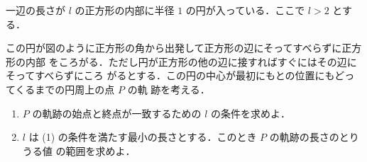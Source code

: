 \documentclass[../../main.tex]{subfiles}
\begin{document}
一辺の長さが $l$ の正方形の内部に半径 $1$ の円が入っている．ここで $l > 2$ とする．

この円が図のように正方形の角から出発して正方形の辺にそってすべらずに正方形の内部
をころがる．ただし円が正方形の他の辺に接すればすぐにはその辺にそってすべらずにころ
がるとする．この円の中心が最初にもとの位置にもどってくるまでの円周上の点 $P$ の軌
跡を考える．

\begin{enumerate}
  \item[(1)] $P$ の軌跡の始点と終点が一致するための $l$ の条件を求めよ．
  \item[(2)] $l$ は (1) の条件を満たす最小の長さとする．このとき $P$ の軌跡の長さのとりうる値
    の範囲を求めよ．
\end{enumerate}

\begin{figure}[H]
  \centering
\end{figure}
\end{document}
